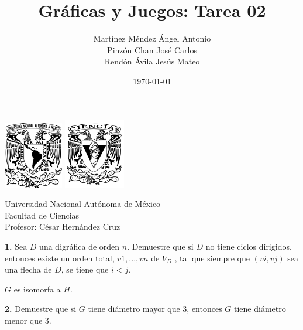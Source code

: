 \documentclass[12pt]{article}
\title{\textbf{Gráficas y Juegos: Tarea 02}}
\author{Martínez Méndez Ángel Antonio\\Pinzón Chan José Carlos\\Rendón Ávila Jesús Mateo}
\date{\today}
\begin{document}
\maketitle
\begin{center}
\vspace{3cm}
\includegraphics[width=0.195\textwidth]{Escudo.png}
\hspace{0.5cm}
\includegraphics[width=0.2\textwidth]{logo_ciencias.png}
\end{center}
\begin{center}
    \vspace{1cm}
    Universidad Nacional Autónoma de México\\
    Facultad de Ciencias\\
    Profesor: César Hernández Cruz\\
\end{center}

\newpage

%
%
\textbf{1.} Sea $D$ una digráfica de orden $n$. Demuestre que si $D$ no tiene ciclos dirigidos,
entonces existe un orden total, $v1 , . . . , vn$ de $V_D$ , tal que siempre que $(vi , vj)$ sea
una flecha de $D$, se tiene que $i < j$.

\begin{tcolorbox}[title=\textbf{Hipotesis}, colback=red!15!white, colframe=black!, breakable]
    $G$ es isomorfa a $H$.
\end{tcolorbox}

\vspace{1cm}

%
%
\textbf{2.} Demuestre que si $G$ tiene diámetro mayor que 3, entonces $\overline{G}$ tiene diámetro menor que 3.
\end{document}
